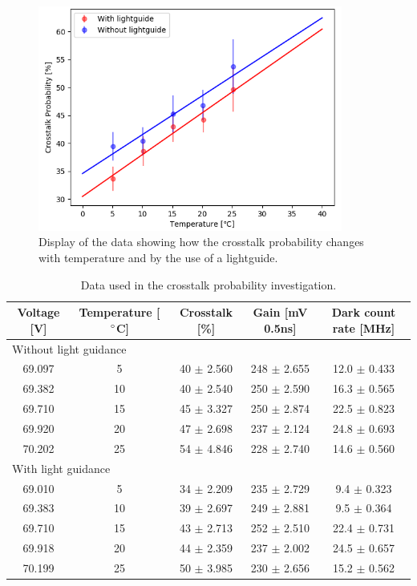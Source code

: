 \documentclass[10pt,a4paper]{article}
\begin{document}
\begin{figure}[H]
\centering
\includegraphics[width=10cm]{crosstalkplot}
\caption{Display of the data showing how the crosstalk probability changes with temperature and by the use of a lightguide.}
\label{fig3}
\end{figure}
\begin{table}[H]
\centering
\caption{Data used in the crosstalk probability investigation.}
\begin{tabular}{|c|c|c|c|c|}
\hline 
Voltage [V] & Temperature [$\degree$C] & Crosstalk [\%] & Gain [mV 0.5ns] & Dark count rate [MHz] \\ 
\hline 
 \multicolumn{5}{|l|}{Without light guidance} \\ 
\hline 
69.097 & 5 & 40 $\pm$ 2.560 & 248 $\pm$ 2.655 &  12.0 $\pm$ 0.433\\ 
\hline 
69.382 & 10 & 40 $\pm$ 2.540 & 250 $\pm$ 2.590 & 16.3 $\pm$ 0.565\\ 
\hline 
69.710 & 15 & 45 $\pm$ 3.327 & 250 $\pm$ 2.874 & 22.5 $\pm$ 0.823\\ 
\hline 
69.920 & 20 & 47 $\pm$ 2.698 & 237 $\pm$ 2.124 & 24.8 $\pm$ 0.693\\ 
\hline 
70.202 & 25 & 54 $\pm$ 4.846 & 228 $\pm$ 2.740 & 14.6 $\pm$ 0.560\\ 
\hline 
 \multicolumn{5}{|l|}{With light guidance} \\ 
\hline 
69.010 & 5 & 34 $\pm$ 2.209 & 235 $\pm$ 2.729 & 9.4 $\pm$ 0.323\\ 
\hline 
69.383 & 10 & 39 $\pm$ 2.697 & 249 $\pm$ 2.881 & 9.5 $\pm$ 0.364\\ 
\hline 
69.710 & 15 & 43 $\pm$ 2.713 & 252 $\pm$ 2.510 & 22.4 $\pm$ 0.731\\ 
\hline 
69.918 & 20 & 44 $\pm$ 2.359 & 237 $\pm$ 2.002 & 24.5 $\pm$ 0.657\\ 
\hline 
70.199 & 25 & 50 $\pm$ 3.985 & 230 $\pm$ 2.656 & 15.2 $\pm$ 0.562\\ 
\hline 
\end{tabular} 
\label{Table 3}
\end{table}
\end{document}
